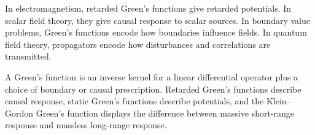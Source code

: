 In electromagnetism, retarded Green's functions give retarded potentials. In
scalar field theory, they give causal response to scalar sources. In boundary
value problems, Green's functions encode how boundaries influence fields. In
quantum field theory, propagators encode how disturbances and correlations are
transmitted.

\begin{summarybox}
A Green's function is an inverse kernel for a linear differential operator plus a
choice of boundary or causal prescription. Retarded Green's functions describe
causal response, static Green's functions describe potentials, and the
Klein--Gordon Green's function displays the difference between massive
short-range response and massless long-range response.
\end{summarybox}
